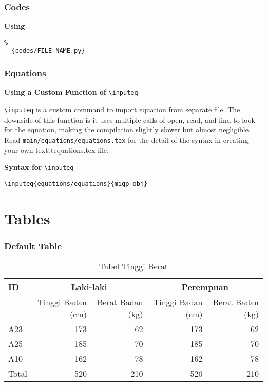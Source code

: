 \documentclass{beamer}
\begin{document}
\begin{frame}[fragile]
  \frametitle{Codes}

  \textbf{Using} \verb||

  \begin{block}{}
    \vspace{-2em}
    \small
    \begin{verbatim}
%
  {codes/FILE_NAME.py}
    \end{verbatim}
  \end{block}

\end{frame}

\begin{frame}[fragile]
  \frametitle{Equations}

  \textbf{Using a Custom Function of} \verb|\inputeq|

  \verb|\inputeq| is a custom command to import equation from separate file. The downside of this function is it uses multiple calls of open, read, and find to look for the equation, making the compilation slightly slower but almost negligible. Read \texttt{main/equations/equations.tex} for the detail of the syntax in creating your own texttt{equations.tex} file.

  \textbf{Syntax for} \verb|\inputeq|

  \begin{block}{}
    \vspace{-2em}
    \small
    \begin{verbatim}
\inputeq{equations/equations}{miqp-obj}
    \end{verbatim}
  \end{block}

\end{frame}

\section{Tables}
\begin{frame}
  \frametitle{Default Table}

  \begin{table}[h]
    \centering
    \caption{Tabel Tinggi Berat}
    \begin{tabular}{|l|r|r|r|r}
      \hline
      ID & \multicolumn{2}{c}{Laki-laki} & \multicolumn{2}{c}{Perempuan} \\
      \hline
       & Tinggi Badan (cm) & Berat Badan (kg) & Tinggi Badan (cm) & Berat Badan (kg) \\
      \hline
      A23   & 173 & 62  & 173 & 62 \\ \hline
      A25   & 185 & 70  & 185 & 70 \\ \hline
      A10   & 162 & 78  & 162 & 78 \\ \hline
      Total & 520 & 210 & 520 & 210 \\ \hline
    \end{tabular}
    \label{tab:tinggiberat}
  \end{table}
\end{frame}
\end{document}
